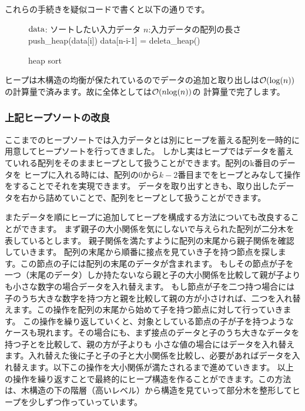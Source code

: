 \documentclass[dvipdfmx,pic,eepic,ecltree]{jarticle}
\begin{document}
これらの手続きを疑似コードで書くと以下の通りです。
\begin{figure}[H]
\begin{algorithm}[H]
	\caption{heap sort}
	\label{heap sort}
	\begin{algorithmic}[1]
	\STATE ${\rm data}$: ソートしたい入力データ
	\STATE $n$:入力データの配列の長さ
	\STATE push\_heap(data[i])
	\ENDFOR
	\STATE data[n-i-1] = deleta\_heap()
	\ENDFOR
	\end{algorithmic}
\end{algorithm}
\end{figure}
ヒープは木構造の均衡が保たれているのでデータの追加と取り出しは$\mathcal{O}({\rm log}(n))$の計算量で済みます。故に全体としては$\mathcal{O}(n{\rm log}(n))$の
計算量で完了します。
\subsubsection{上記ヒープソートの改良}
ここまでのヒープソートでは入力データとは別にヒープを蓄える配列を一時的に用意してヒープソートを行ってきました。
しかし実はヒープではデータを蓄えていれる配列をそのままヒープとして扱うことができます。配列のk番目のデータを
ヒープに入れる時には、配列の0から$k-2$番目までをヒープとみなして操作をすることでそれを実現できます。
データを取り出すときも、取り出したデータを右から詰めていことで、配列をヒープとして扱うことができます。

またデータを順にヒープに追加してヒープを構成する方法についても改良することができます。
まず親子の大小関係を気にしないで与えられた配列が二分木を表しているとします。
親子関係を満たすように配列の末尾から親子関係を確認していきます。
配列の末尾から順番に接点を見ていき子を持つ節点を探します。この節点の子には配列の末尾のデータが含まれます。
もしその節点が子を一つ（末尾のデータ）しか持たないなら親と子の大小関係を比較して親が子よりも小さな数字の場合データを入れ替えます。
もし節点が子を二つ持つ場合には子のうち大きな数字を持つ方と親を比較して親の方が小さければ、二つを入れ替えます。この操作を配列の末尾から始めて子を持つ節点に対して行っていきます。
この操作を繰り返していくと、対象としている節点の子が子を持つようなケースも現れます。その場合にも、まず接点のデータと子のうち大きなデータを持つ子とを比較して、親の方が子よりも
小さな値の場合にはデータを入れ替えます。入れ替えた後に子と子の子と大小関係を比較し、必要があればデータを入れ替えます。以下この操作を大小関係が満たされるまで進めていきます。
以上の操作を繰り返すことで最終的にヒープ構造を作ることができます。この方法は、木構造の下の階層（高いレベル）から構造を見ていって部分木を整形してヒープを少しずつ作っていっています。
\end{document}
